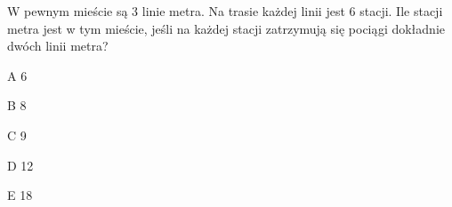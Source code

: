 \begin{tresc}
W pewnym mieście są 3 linie metra. Na trasie każdej linii jest 6 stacji. Ile stacji metra jest w tym mieście, jeśli na każdej stacji zatrzymują się pociągi dokładnie dwóch linii metra?
\end{tresc}
\begin{wariant}{A} 6 \end{wariant}
\begin{wariant}{B} 8 \end{wariant}
\begin{wariant}{C} 9 \end{wariant}
\begin{wariant}{D} 12 \end{wariant}
\begin{wariant}{E} 18 \end{wariant}
